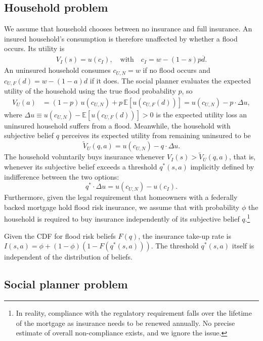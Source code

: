 \documentclass[12pt]{article}
\begin{document}
\subsection{Household problem}

We assume that household chooses between no insurance and full insurance. An insured household's consumption is therefore unaffected by whether a flood occurs. Its utility is
\begin{align}
    V_I(s) = u(c_I), \quad \text{with} \quad c_I = w - (1-s)p\overline{d}.
\end{align}
An uninsured household consumes $c_{U,N} = w$ if no flood occurs and $c_{U,F}(d) = w-(1-a)d$ if it does. The social planner evaluates the expected utility of the household using the true flood probability $p$, so
\begin{align}
    V_U(a) &= (1-p)\,u(c_{U,N}) + p\,\mathbb{E}[u(c_{U,F}(d))] = u(c_{U,N}) - p\cdot\Delta u,
\end{align}
where $\Delta u \equiv u(c_{U,N})-\mathbb{E}[u(c_{U,F}(d))]>0$ is the expected utility loss an uninsured household suffers from a flood. Meanwhile, the household with subjective belief $q$ perceives its expected utility from remaining uninsured to be
\begin{equation}
    \tilde{V}_U(q,a) = u(c_{U,N}) - q\cdot\Delta u.
\end{equation}
The household voluntarily buys insurance whenever $V_I(s) > \tilde{V}_U(q,a)$, that is, whenever its subjective belief exceeds a threshold $q^*(s,a)$ implicitly defined by indifference between the two options:
\begin{equation}
    q^*\cdot\Delta u = u(c_{U,N}) - u(c_I). \label{eq:qstar_prog}
\end{equation}
Furthermore, given the legal requirement that homeowners with a federally backed mortgage hold flood risk insurance, we assume that with probability $\phi$ the household is required to buy insurance independently of its subjective belief $q$.\footnote{In reality, compliance with the regulatory requirement falls over the lifetime of the mortgage as insurance needs to be renewed annually. No precise estimate of overall non-compliance exists, and we ignore the issue.}  

Given the CDF for flood risk beliefs $F(q)$, the insurance take-up rate is $I(s,a) = \phi+(1-\phi)(1-F(q^*(s,a)))$. The threshold $q^*(s,a)$ itself is independent of the distribution of beliefs.

\subsection{Social planner problem}
\end{document}
